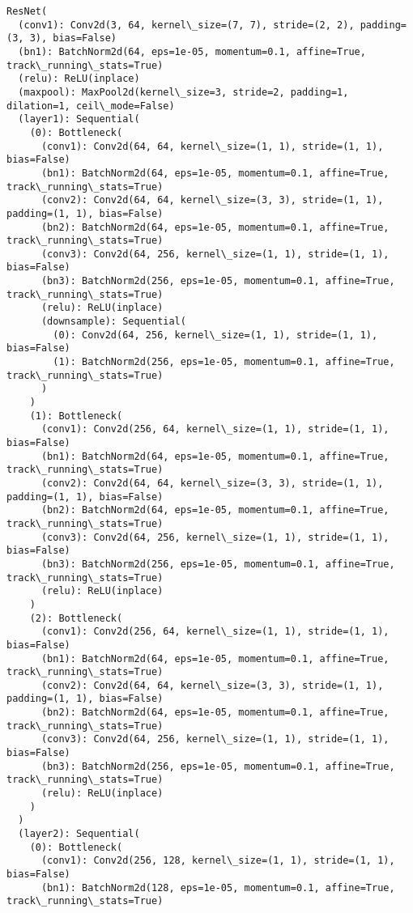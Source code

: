 \documentclass[11pt]{article}
\begin{document}
    \begin{Verbatim}[commandchars=\\\{\}]
ResNet(
  (conv1): Conv2d(3, 64, kernel\_size=(7, 7), stride=(2, 2), padding=(3, 3), bias=False)
  (bn1): BatchNorm2d(64, eps=1e-05, momentum=0.1, affine=True, track\_running\_stats=True)
  (relu): ReLU(inplace)
  (maxpool): MaxPool2d(kernel\_size=3, stride=2, padding=1, dilation=1, ceil\_mode=False)
  (layer1): Sequential(
    (0): Bottleneck(
      (conv1): Conv2d(64, 64, kernel\_size=(1, 1), stride=(1, 1), bias=False)
      (bn1): BatchNorm2d(64, eps=1e-05, momentum=0.1, affine=True, track\_running\_stats=True)
      (conv2): Conv2d(64, 64, kernel\_size=(3, 3), stride=(1, 1), padding=(1, 1), bias=False)
      (bn2): BatchNorm2d(64, eps=1e-05, momentum=0.1, affine=True, track\_running\_stats=True)
      (conv3): Conv2d(64, 256, kernel\_size=(1, 1), stride=(1, 1), bias=False)
      (bn3): BatchNorm2d(256, eps=1e-05, momentum=0.1, affine=True, track\_running\_stats=True)
      (relu): ReLU(inplace)
      (downsample): Sequential(
        (0): Conv2d(64, 256, kernel\_size=(1, 1), stride=(1, 1), bias=False)
        (1): BatchNorm2d(256, eps=1e-05, momentum=0.1, affine=True, track\_running\_stats=True)
      )
    )
    (1): Bottleneck(
      (conv1): Conv2d(256, 64, kernel\_size=(1, 1), stride=(1, 1), bias=False)
      (bn1): BatchNorm2d(64, eps=1e-05, momentum=0.1, affine=True, track\_running\_stats=True)
      (conv2): Conv2d(64, 64, kernel\_size=(3, 3), stride=(1, 1), padding=(1, 1), bias=False)
      (bn2): BatchNorm2d(64, eps=1e-05, momentum=0.1, affine=True, track\_running\_stats=True)
      (conv3): Conv2d(64, 256, kernel\_size=(1, 1), stride=(1, 1), bias=False)
      (bn3): BatchNorm2d(256, eps=1e-05, momentum=0.1, affine=True, track\_running\_stats=True)
      (relu): ReLU(inplace)
    )
    (2): Bottleneck(
      (conv1): Conv2d(256, 64, kernel\_size=(1, 1), stride=(1, 1), bias=False)
      (bn1): BatchNorm2d(64, eps=1e-05, momentum=0.1, affine=True, track\_running\_stats=True)
      (conv2): Conv2d(64, 64, kernel\_size=(3, 3), stride=(1, 1), padding=(1, 1), bias=False)
      (bn2): BatchNorm2d(64, eps=1e-05, momentum=0.1, affine=True, track\_running\_stats=True)
      (conv3): Conv2d(64, 256, kernel\_size=(1, 1), stride=(1, 1), bias=False)
      (bn3): BatchNorm2d(256, eps=1e-05, momentum=0.1, affine=True, track\_running\_stats=True)
      (relu): ReLU(inplace)
    )
  )
  (layer2): Sequential(
    (0): Bottleneck(
      (conv1): Conv2d(256, 128, kernel\_size=(1, 1), stride=(1, 1), bias=False)
      (bn1): BatchNorm2d(128, eps=1e-05, momentum=0.1, affine=True, track\_running\_stats=True)

\end{Verbatim}
\end{document}
